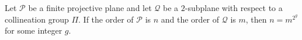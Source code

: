 Let $\mathcal{P}$ be a finite projective plane and let $\mathcal{Q}$ be a $2$-subplane with respect to a collineation group $\Pi$. If the order of $\mathcal{P}$ is $n$ and the order of $\mathcal{Q}$ is $m$, then $n = m^{2^g}$ for some integer $g$.
